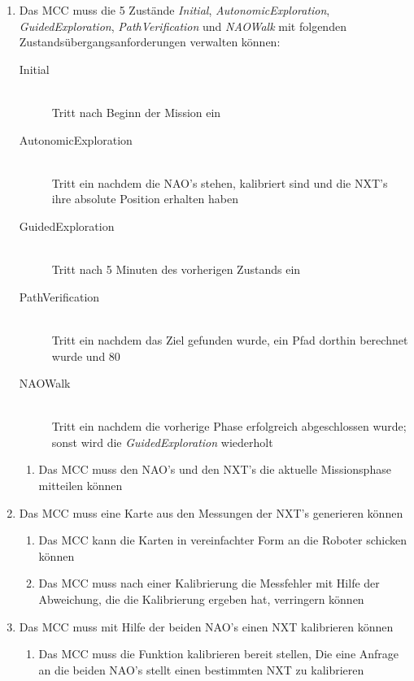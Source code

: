 \begin{enumerate}
\begin{enumerate}
        \item Das MCC muss die 5 Zustände \textit{Initial}, \textit{AutonomicExploration}, \textit{GuidedExploration}, \textit{PathVerification} und \textit{NAOWalk} mit folgenden Zustandsübergangsanforderungen verwalten können:
        \begin{description}
             \item[Initial] \hfill \\
             Tritt nach Beginn der Mission ein
             \item[AutonomicExploration] \hfill \\
             Tritt ein nachdem die NAO's stehen, kalibriert sind und die NXT's ihre absolute Position erhalten haben
             \item[GuidedExploration] \hfill \\
             Tritt nach 5 Minuten des vorherigen Zustands ein
             \item[PathVerification] \hfill \\
             Tritt ein nachdem das Ziel gefunden wurde, ein Pfad dorthin berechnet wurde und 80%
             \item[NAOWalk] \hfill \\
             Tritt ein nachdem die vorherige Phase erfolgreich abgeschlossen wurde; sonst wird die \textit{GuidedExploration} wiederholt
        \end{description}     
        \begin{enumerate}
            \item Das MCC muss den NAO's und den NXT's die aktuelle Missionsphase mitteilen können
        \end{enumerate}
        \item Das MCC muss eine Karte aus den Messungen der NXT's generieren können
        \begin{enumerate}
            \item Das MCC kann die Karten in vereinfachter Form an die Roboter schicken können

            \item Das MCC muss nach einer Kalibrierung die Messfehler mit Hilfe der Abweichung, die die Kalibrierung ergeben hat, verringern können 
        \end{enumerate}
        \item Das MCC muss mit Hilfe der beiden NAO's einen NXT kalibrieren können
        \begin{enumerate}
            \item Das MCC muss die Funktion kalibrieren bereit stellen, Die eine Anfrage an die beiden NAO's stellt einen bestimmten NXT zu kalibrieren


\end{enumerate}
\end{enumerate}
\end{enumerate}
